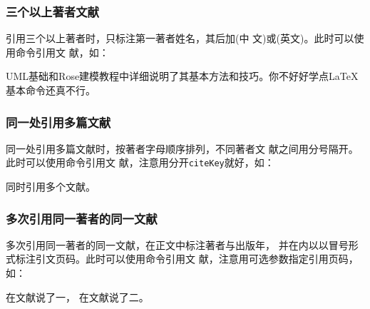 \subsubsection{三个以上著者文献}

引用三个以上著者时，只标注第一著者姓名，其后加(中
文)或(英文)。此时可以使用命令引用文
献，如：

\begin{center}
  \begin{minipage}[h]{0.9\linewidth}    
    \begin{texdemov}%
      UML基础和Rose建模教程中详细说明了其基本方法和技巧\cite{蔡敏2006--}。你不好好学点\LaTeX{}基本命令还真不行\cite{r9}。%
    \end{texdemov}
  \end{minipage}
\end{center}

\subsubsection{同一处引用多篇文献}

同一处引用多篇文献时，按著者字母顺序排列，不同著者文
献之间用分号隔开。此时可以使用命令引用文
献，注意用分开\texttt{citeKey}就好，如：

\begin{center}
  \begin{minipage}[h]{0.9\linewidth}    
    \begin{texdemov}%
      同时引用多个文献\cite{r2,r3,r4,r6}。%
    \end{texdemov}
  \end{minipage}
\end{center}
  
\subsubsection{多次引用同一著者的同一文献}

多次引用同一著者的同一文献，在正文中标注著者与出版年，
并在\qtmark{()}内以以冒号形式标注引文页码。此时可以使用命令引用文
献，注意用可选参数指定引用页码，如：

\begin{center}
  \begin{minipage}[h]{0.9\linewidth}    
    \begin{texdemov}%
      在文献\parencite[20-22]{程根伟1999-32-36}说了一， 在文献\parencite[55-60]{程根伟1999-32-36}说了二。%
    \end{texdemov}
  \end{minipage}
\end{center}

